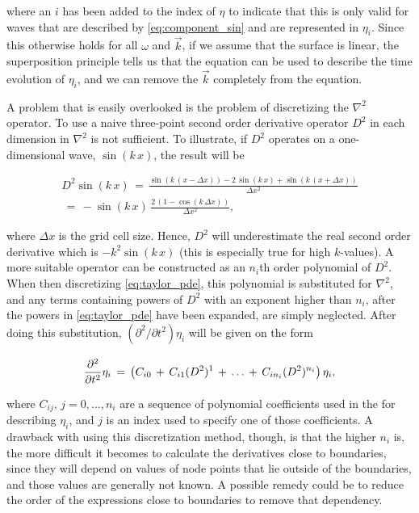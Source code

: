where an $i$ has been added to the index of $\eta$ to indicate that this \PDE is only valid for waves that are described by \eqref{eq:component_sin} and are represented in $\eta_i$. Since this \PDE otherwise holds for all $\omega$ and $\vec{k}$, if we assume that the surface is linear, the superposition principle tells us that the equation can be used to describe the time evolution of $\eta_i$, and we can remove the $\vec{k}$ completely from the equation.

A problem that is easily overlooked is the problem of discretizing the $\nabla^2$ operator. To use a naive three-point second order derivative operator $D^2$ in each dimension in $\nabla^2$ is not sufficient. To illustrate, if $D^2$ operates on a one-dimensional wave, $\sin(k\,x)$, the result will be

\begin{equation}
\renewcommand*{\arraystretch}{2}
\begin{array}{c}
\displaystyle D^2\sin(k\,x) \,=\, \frac{\sin(k\,(x-\Delta x)) - 2\,\sin(k\,x) + \sin(k\,(x+\Delta x))}{\Delta x^2} \\
\displaystyle \,=\, -\sin(k\,x)\,\frac{2\,(1-\cos(k\,\Delta x))}{\Delta x^2},
\end{array}
\end{equation}

where $\Delta x$ is the grid cell size. Hence, $D^2$ will underestimate the real second order derivative which is $-k^2\sin(k\,x)$ (this is especially true for high $k$-values). A more suitable operator can be constructed as an $n_i$th order polynomial of $D^2$. When then discretizing \eqref{eq:taylor_pde}, this polynomial is substituted for $\nabla^2$, and any terms containing powers of $D^2$ with an exponent higher than $n_i$, after the powers in \eqref{eq:taylor_pde} have been expanded, are simply neglected. After doing this substitution, $(\partial^2/\partial t^2)\eta_i$ will be given on the form

\begin{equation} \label{eq:polynomial_pde}
\renewcommand*{\arraystretch}{2}
\begin{array}{c}
\displaystyle \frac{\partial^2}{\partial t^2}\eta_i \,=\, \left(C_{i0} \,+\, C_{i1}(D^2)^1 \,+\, \dots \,+\, C_{in_i}(D^2)^{n_i}\right)\eta_i,
\end{array}
\end{equation}

where $C_{ij},\,j=0,\dots,n_i$ are a sequence of polynomial coefficients used in the \PDE for describing $\eta_i$, and $j$ is an index used to specify one of those coefficients. A drawback with using this discretization method, though, is that the higher $n_i$ is, the more difficult it becomes to calculate the derivatives close to boundaries, since they will depend on values of node points that lie outside of the boundaries, and those values are generally not known. A possible remedy could be to reduce the order of the expressions close to boundaries to remove that dependency.

